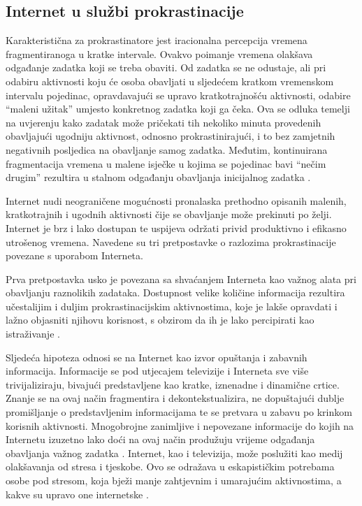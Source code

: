 \documentclass[11pt,english]{article}
\begin{document}
\begin{multicols}{2}
\section{Internet u službi prokrastinacije}
Karakteristična za prokrastinatore jest iracionalna percepcija vremena
fragmentiranoga u kratke intervale. Ovakvo poimanje vremena olakšava odgađanje
zadatka koji se treba obaviti. Od zadatka se ne odustaje, ali pri odabiru
aktivnosti koju će osoba obavljati u sljedećem kratkom vremenskom intervalu
pojedinac, opravdavajući se upravo kratkotrajnošću aktivnosti, odabire ``maleni
užitak'' umjesto konkretnog zadatka koji ga čeka. Ova se odluka temelji na
uvjerenju kako zadatak može pričekati tih nekoliko minuta provedenih obavljajući
ugodniju aktivnost, odnosno prokrastinirajući, i to bez zamjetnih negativnih
posljedica na obavljanje samog zadatka. Međutim, kontinuirana fragmentacija
vremena u malene isječke u kojima se pojedinac bavi ``nečim drugim'' rezultira u
stalnom odgađanju obavljanja inicijalnog zadatka \cite{Online08thatchera}.

Internet nudi neograničene mogućnosti pronalaska prethodno opisanih malenih,
kratkotrajnih i ugodnih aktivnosti čije se obavljanje može prekinuti po želji.
Internet je brz i lako dostupan te uspijeva održati privid produktivno i efikasno
utrošenog vremena. Navedene su tri pretpostavke o razlozima prokrastinacije
povezane s uporabom Interneta.

Prva pretpostavka usko je povezana sa shvaćanjem Interneta kao važnog alata pri
obavljanju raznolikih zadataka. Dostupnost velike količine informacija rezultira
učestalijim i duljim prokrastinacijskim aktivnostima, koje je lakše opravdati i
lažno objasniti njihovu korisnost, s obzirom da ih je lako percipirati kao
istraživanje \cite{Lavoie01cyberslacking}.

Sljedeća hipoteza odnosi se na Internet kao izvor opuštanja i zabavnih
informacija. Informacije se pod utjecajem televizije i Interneta sve više
trivijaliziraju, bivajući predstavljene kao kratke, iznenadne i dinamične crtice.
Znanje se na ovaj način fragmentira i dekontekstualizira, ne dopuštajući dublje
promišljanje o predstavljenim informacijama te se pretvara u zabavu po krinkom
korisnih aktivnosti.  Mnogobrojne zanimljive i nepovezane informacije do kojih na
Internetu izuzetno lako doći na ovaj način produžuju vrijeme odgađanja obavljanja
važnog zadatka \cite{Postman85amusing}. Internet, kao i televizija, može
poslužiti kao medij olakšavanja od stresa i tjeskobe. Ovo se odražava u
eskapističkim potrebama osobe pod stresom, koja bježi manje zahtjevnim i
umarajućim aktivnostima, a kakve su upravo one internetske
\cite{Lavoie01cyberslacking}.


\end{multicols}
\end{document}
